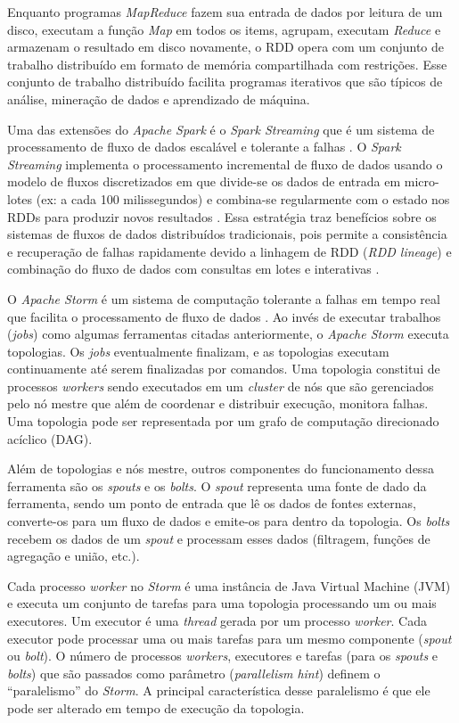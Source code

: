 Enquanto programas \emph{MapReduce} fazem sua entrada de dados por leitura de um
disco, executam a função \emph{Map} em todos os items, agrupam, executam
\emph{Reduce} e armazenam o resultado em disco novamente, o RDD opera com um
conjunto de trabalho distribuído em formato de memória compartilhada com
restrições. Esse conjunto de trabalho distribuído facilita programas iterativos
que são típicos de análise, mineração de dados e aprendizado de máquina.

Uma das extensões do \emph{Apache Spark} é o \emph{Spark Streaming} que é um
sistema de processamento de fluxo de dados escalável e tolerante a falhas
\cite{zaharia2016,sparkStreaming2016}.
O \emph{Spark Streaming} implementa o processamento incremental de fluxo de
dados usando o modelo de fluxos discretizados em que divide-se os dados de entrada
em micro-lotes (ex: a cada 100 milissegundos) e combina-se regularmente com o
estado nos RDDs para produzir novos resultados \cite{zaharia2016}.
Essa estratégia traz benefícios sobre os sistemas de fluxos de dados distribuídos
tradicionais, pois permite a consistência e recuperação de falhas rapidamente
devido a linhagem de RDD (\emph{RDD lineage}) e combinação do fluxo de dados com
consultas em lotes e interativas \cite{sparkStreaming2016,Lopez2018}.

O \emph{Apache Storm} é um sistema de computação tolerante a falhas em tempo
real que facilita o processamento de fluxo de dados
\cite{ApacheStorm2020,Lopez2018}.
Ao invés de executar trabalhos (\emph{jobs}) como algumas ferramentas citadas
anteriormente, o \emph{Apache Storm} executa topologias.
Os \emph{jobs} eventualmente finalizam, e as topologias executam continuamente até
serem finalizadas por comandos.
Uma topologia constitui de processos \emph{workers} sendo executados
em um \emph{cluster} de nós que são gerenciados pelo nó mestre que além de
coordenar e distribuir execução, monitora falhas.
Uma topologia pode ser representada por um grafo de computação direcionado
acíclico (DAG).

Além de topologias e nós mestre, outros componentes do funcionamento dessa
ferramenta são os \emph{spouts} e os \emph{bolts}.
O \emph{spout} representa uma fonte de dado da ferramenta, sendo um ponto de
entrada que lê os dados de fontes externas, converte-os para um fluxo de dados e
emite-os para dentro da topologia.
Os \emph{bolts} recebem os dados de um \emph{spout} e processam esses dados
(filtragem, funções de agregação e união, etc.).

Cada processo \emph{worker} no \emph{Storm} é uma instância de Java Virtual Machine (JVM)
e executa um conjunto de tarefas para uma topologia processando um ou mais
executores.
Um executor é uma \emph{thread} gerada por um processo \emph{worker}.
Cada executor pode processar uma ou mais tarefas para um mesmo componente
(\emph{spout} ou \emph{bolt}).
O número de processos \emph{workers}, executores e tarefas (para os
\emph{spouts} e \emph{bolts}) que são passados como parâmetro (\emph{parallelism
hint}) definem o ``paralelismo'' do \emph{Storm}. A principal característica desse
paralelismo é que ele pode ser alterado em tempo de execução da topologia.

